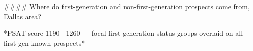 #### Where do first-generation and non-first-generation prospects come from, Dallas area?

*PSAT score 1190 - 1260 — focal first-generation-status groups overlaid on all first-gen-known prospects*
